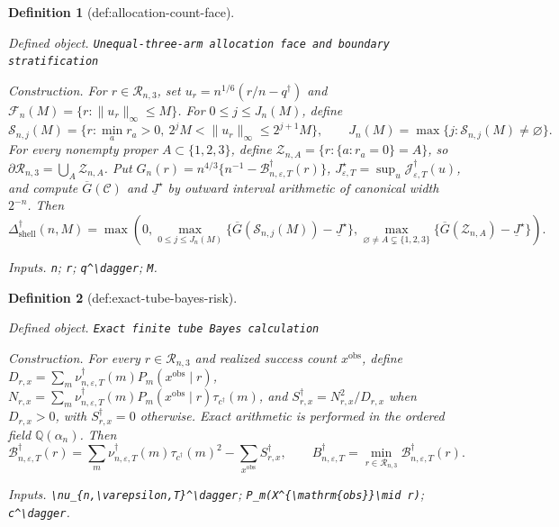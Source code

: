 \documentclass{article}
\newtheorem{definition}{Definition}
\begin{document}
\begin{definition}[def:allocation-count-face]\label{def:allocation-count-face}
\par\smallskip\noindent\emph{Defined object.} \texttt{Unequal-\allowbreak{}three-\allowbreak{}arm allocation face and boundary stratification}
\par\smallskip\noindent\emph{Construction.} For \(r\in\mathcal R_{n,3}\), set \(u_r=n^{1/6}(r/n-q^\dagger)\) and \(\mathcal F_n(M)=\{r:\|u_r\|_\infty\le M\}\). For \(0\le j\le J_n(M)\), define \[\mathcal S_{n,j}(M)=\{r:\min_ar_a>0,\ 2^jM<\|u_r\|_\infty\le2^{j+1}M\},\qquad J_n(M)=\max\{j:\mathcal S_{n,j}(M)\ne\varnothing\}.\] For every nonempty proper \(A\subset\{1,2,3\}\), define \(\mathcal Z_{n,A}=\{r:\{a:r_a=0\}=A\}\), so \(\partial\mathcal R_{n,3}=\bigcup_A\mathcal Z_{n,A}\). Put \(G_n(r)=n^{4/3}\{n^{-1}-\mathcal B_{n,\varepsilon,T}^\dagger(r)\}\), \(J_{\varepsilon,T}^\star=\sup_u\mathcal J_{\varepsilon,T}^\dagger(u)\), and compute \(\overline G(\mathcal C)\) and \(\underline J^\star\) by outward interval arithmetic of canonical width \(2^{-n}\). Then \[\Delta_{\mathrm{shell}}^\dagger(n,M)=\max\!\left(0,\max_{0\le j\le J_n(M)}\{\overline G(\mathcal S_{n,j}(M))-\underline J^\star\},\max_{\varnothing\ne A\subsetneq\{1,2,3\}}\{\overline G(\mathcal Z_{n,A})-\underline J^\star\}\right).\]
\par\smallskip\noindent\emph{Inputs.} \texttt{n}; \texttt{r}; \texttt{q\textasciicircum{}\textbackslash{}\allowbreak{}dagger}; \texttt{M}.
\end{definition}

\begin{definition}[def:exact-tube-bayes-risk]\label{def:exact-tube-bayes-risk}
\par\smallskip\noindent\emph{Defined object.} \texttt{Exact finite tube Bayes calculation}
\par\smallskip\noindent\emph{Construction.} For every \(r\in\mathcal R_{n,3}\) and realized success count \(x^{\mathrm{obs}}\), define \(D_{r,x}=\sum_m\nu_{n,\varepsilon,T}^\dagger(m)P_m(x^{\mathrm{obs}}\mid r)\), \(N_{r,x}=\sum_m\nu_{n,\varepsilon,T}^\dagger(m)P_m(x^{\mathrm{obs}}\mid r)\tau_{c^\dagger}(m)\), and \(S_{r,x}^\dagger=N_{r,x}^2/D_{r,x}\) when \(D_{r,x}>0\), with \(S_{r,x}^\dagger=0\) otherwise. Exact arithmetic is performed in the ordered field \(\mathbb Q(\alpha_n)\). Then \[\mathcal B_{n,\varepsilon,T}^\dagger(r)=\sum_m\nu_{n,\varepsilon,T}^\dagger(m)\tau_{c^\dagger}(m)^2-\sum_{x^{\mathrm{obs}}}S_{r,x}^\dagger,\qquad B_{n,\varepsilon,T}^\dagger=\min_{r\in\mathcal R_{n,3}}\mathcal B_{n,\varepsilon,T}^\dagger(r).\]
\par\smallskip\noindent\emph{Inputs.} \texttt{\textbackslash{}\allowbreak{}nu\_\allowbreak{}\{n,\allowbreak{}\textbackslash{}\allowbreak{}varepsilon,\allowbreak{}T\}\allowbreak{}\textasciicircum{}\textbackslash{}\allowbreak{}dagger}; \texttt{P\_\allowbreak{}m(X\textasciicircum{}\{\textbackslash{}\allowbreak{}mathrm\{obs\}\allowbreak{}\}\allowbreak{}\textbackslash{}\allowbreak{}mid r)}; \texttt{c\textasciicircum{}\textbackslash{}\allowbreak{}dagger}.
\end{definition}
\end{document}
